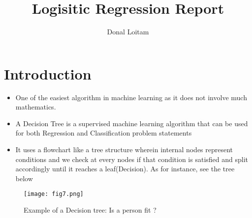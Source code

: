 \documentclass[a4paper, 11pt]{article}
\title{Logisitic Regression Report}
\author{Donal Loitam}
\begin{document}
\maketitle
\tableofcontents

\section{Introduction}
\begin{itemize}
    \item One of the easiest algorithm in machine learning as it does not involve much mathematics.
    \item A Decision Tree is a supervised machine learning algorithm that can be used for both Regression and Classification problem statements
    \item It uses a flowchart like a tree structure  wherein internal nodes represent conditions and we check at every nodes if that condition is satisfied and split accordingly until it reaches a leaf(Decision). As for instance, see the tree below
\end{itemize}
\begin{figure}[h!]
    \texttt{[image: fig7.png]}
    \caption{Example of a Decision tree: Is a person fit ?}
    \label{fig:fig7}
  \end{figure}

\pagebreak
\end{document}
